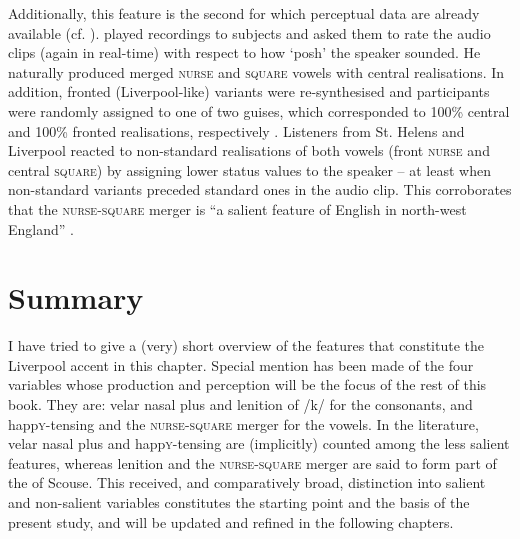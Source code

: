Additionally, this feature is the second for which perceptual data are already available (cf. ).
\textcite{watsonclark2013} played recordings to subjects and asked them to rate the audio clips (again in real-time) with respect to how `posh' the speaker sounded.
He naturally produced merged \textsc{nurse} and \textsc{square} vowels with central realisations.
In addition, fronted (Liverpool-like) variants were re-synthesised and participants were randomly assigned to one of two guises, which corresponded to 100\% central and 100\% fronted realisations, respectively \parencite[cf.][305--306]{watsonclark2013}.
Listeners from St. Helens and Liverpool reacted to non-standard realisations of both vowels (front \textsc{nurse} and central \textsc{square}) by assigning lower status values to the speaker -- at least when non-standard variants preceded standard ones in the audio clip.
This corroborates that the \textsc{nurse}-\textsc{square} merger is ``a salient feature of English in north-west England'' \parencite[cf.][317--320]{watsonclark2013}.

	\section{Summary}

I have tried to give a (very) short overview of the features that constitute the Liverpool accent in this chapter.
Special mention has been made of the four variables whose production and perception will be the focus of the rest of this book.
They are: velar nasal plus and lenition of /k/ for the consonants, and happ\textsc{y}-tensing and the \textsc{nurse}-\textsc{square} merger for the vowels.
In the literature, velar nasal plus and happ\textsc{y}-tensing are (implicitly) counted among the less salient features, whereas lenition and the \textsc{nurse}-\textsc{square} merger are said to form part of the  of Scouse.
This received, and comparatively broad, distinction into salient and non-salient variables constitutes the starting point and the basis of the present study, and will be updated and refined in the following chapters.